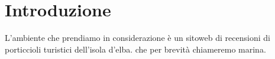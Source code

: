 \chapter{Introduzione}

L'ambiente che prendiamo in considerazione è un sitoweb di recensioni di porticcioli turistici dell'isola d'elba. che per brevità chiameremo marina.